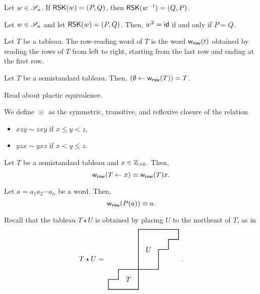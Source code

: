 \begin{corollary}
    Let \(w \in \mathscr{S}_{n}\).
    If \(\operatorname{\mathsf{RSK}}(w) = (P, Q)\),
    then \(\operatorname{\mathsf{RSK}}(w^{-1}) = (Q, P)\).
\end{corollary}

\begin{corollary}
    Let \(w \in \mathscr{S}_{n}\) and let \(\operatorname{\mathsf{RSK}}(w) = (P, Q)\).
    Then, \(w^2 = \operatorname{\mathsf{id}}\) if and only if \(P = Q\).
\end{corollary}

\begin{definition}
    Let \(T\) be a tableau.
    The row-reading word of \(T\) is the word 
    \(\operatorname{\mathsf{w}_{\text{\textsf{row}}}}(t)\) obtained by reading the rows of \(T\) from left to right,
    starting from the last row and ending at the first row.
\end{definition}

\begin{lemma}
    Let \(T\) be a semistandard tableau.
    Then, \((\emptyset \leftarrow \operatorname{\mathsf{w}_{\text{\textsf{row}}}}(T)) = T\).
\end{lemma}

Read \cite{Fulton1997} about plactic equivalence.

\begin{definition}
    We define  \(\equiv\) as the symmetric, transitive, and reflexive closure of the relation
    \begin{itemize}
        \item \(xzy \sim zxy\) if \(x \leq y < z\),
        \item \(yzx \sim yxz\) if \(x < y \leq z\).
    \end{itemize}
\end{definition}

\begin{lemma}
    Let \(T\) be a semistandard tableau and \(x \in \mathbb{Z}_{> 0}\).
    Then,
    \begin{equation}
        \operatorname{\mathsf{w}_{\text{\textsf{row}}}}(T \leftarrow x) \equiv \operatorname{\mathsf{w}_{\text{\textsf{row}}}}(T) x.
    \end{equation}
\end{lemma}

\begin{corollary}
    Let \(a = a_1 a_2 \cdots a_n\) be a word.
    Then,
    \begin{equation}
        \operatorname{\mathsf{w}_{\text{\textsf{row}}}}(P(a)) \equiv a.
    \end{equation}
\end{corollary}

Recall that the tableau \(T \star U\) is obtained by placing \(U\) to the northeast of \(T\), as in
\begin{equation}
    T \star U = 
    \vcenter{\hbox{
    \begin{tikzpicture}[scale=.5, thick]
        \draw (0, 0) -- (2, 0) -- (2, 2) -- (3, 2) -- (3, 3) -- (4, 3) -- (4, 4) -- (0, 4) -- cycle;
        \draw (0, 0) -- (-2, 0) -- (-2, -1) -- (-3, -1) -- (-3, -2) -- (0, -2) -- cycle;
        \node at (1, 2) {\(U\)};
        \node at (-1, -1) {\(T\)};
    \end{tikzpicture}
    }}.
\end{equation}

